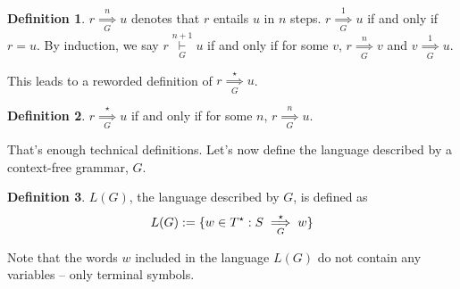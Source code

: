 \documentclass[]{article}
\DeclarePairedDelimiter{\set}{\lbrace}{\rbrace}
\theoremstyle{definition}
\newtheorem*{defn}{Definition}
\begin{document}
        \begin{defn}
          $r \underset{G}{\overset{n}{\implies}} u$ denotes that $r$ entails $u$ in $n$ steps. $r \underset{G}{\overset{1}{\implies}} u$ if and only if $r = u$. By induction, we say $r \underset{G}{\overset{n+1}{\vdash}} u$ if and only if for some $v$, $r \underset{G}{\overset{n}{\implies}} v$ and $v \underset{G}{\overset{1}{\implies}} u$.
        \end{defn}

        This leads to a reworded definition of $r \underset{G}{\overset{\star}{\implies}} u$.
        \begin{defn}
          $r \underset{G}{\overset{\star}{\implies}} u$ if and only if for some $n$, $r \underset{G}{\overset{n}{\implies}} u$.
        \end{defn}

        That's enough technical definitions. Let's now define the language described by a context-free grammar, $G$.

        \begin{defn}
          $L(G)$, the language described by $G$, is defined as
          $$
            L(G) := \set{ w \in T^\star : S \underset{G}{\overset{\star}{\implies}} w}
          $$
        \end{defn}

        Note that the words $w$ included in the language $L(G)$ do not contain any variables -- only terminal symbols.
\end{document}
